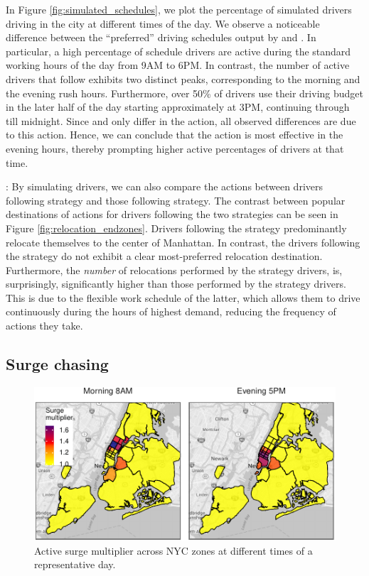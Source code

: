 In Figure \ref{fig:simulated_schedules}, we plot the percentage of simulated drivers driving in the city at different times of the day. We observe a noticeable difference between the ``preferred'' driving schedules 
output by {\flexible} and {\relocationflexible}.
In particular, a high percentage of {\flexible} schedule drivers are active during the standard working hours of the day from 9AM to 6PM. In contrast, the number of active
drivers that follow {\relocationflexible} exhibits two distinct peaks, corresponding to the morning and the evening rush hours. Furthermore, over 50\% of {\relocationflexible} drivers use their driving budget in the later half of the day starting approximately at 3PM, continuing through till midnight. 
Since {\flexible} and {\relocationflexible} only differ in 
the {\relocate} action, all observed differences are due to this action.
Hence, we can  conclude that the {\relocate} action is most effective in the evening hours, thereby prompting higher active percentages of {\relocationflexible} drivers at that time.

: By simulating drivers, we can also compare the {\relocate} actions between drivers following {\relocation} strategy and those following {\relocationflexible} strategy. The contrast between popular destinations 
of {\relocate} actions for drivers following the two strategies can be seen in Figure \ref{fig:relocation_endzones}. 
Drivers following the {\relocation} strategy predominantly relocate themselves to the center of Manhattan. In contrast, the drivers following the {\relocationflexible} strategy do not exhibit a clear most-preferred relocation destination. Furthermore, the 
{\em number} of relocations performed by the {\relocation} strategy drivers, 
is, surprisingly, significantly higher than those performed by the {\relocationflexible} strategy drivers. 
This is due to the flexible work schedule of the latter, which allows them to drive 
  continuously during the hours of highest demand, reducing the frequency of {\relocate} actions they take. 

\subsection{Surge chasing}
\begin{figure}
	\centering
	\includegraphics{figures/surge_heatmap.pdf}
	\caption{Active surge multiplier across NYC zones at different times of a representative day.}
	\label{fig:surge_heatmap}
\end{figure}

